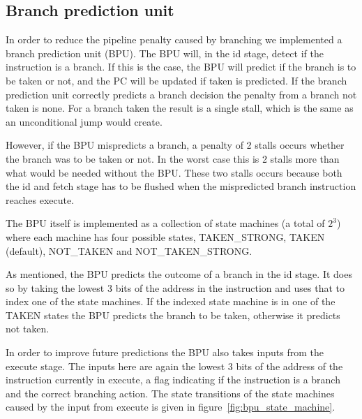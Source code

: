 \subsection{Branch prediction unit}
In order to reduce the pipeline penalty caused by branching we implemented a branch
prediction unit (BPU). The BPU will, in the id stage, detect if the 
instruction is a branch. If this is the case, the BPU will predict if the branch
is to be taken or not, and the PC will be updated if taken is predicted.
If the branch prediction unit correctly predicts a branch decision
the penalty from a branch not taken is none. For a branch taken the
result is a single stall, which is the same as an unconditional jump would create.

However, if the BPU mispredicts a branch, a penalty of 2 stalls occurs whether
the branch was to be taken or not. In the worst case this is 2 stalls more than
what would be needed without the BPU. These two stalls occurs because both the
id and fetch stage has to be flushed when the mispredicted branch instruction reaches execute.

The BPU itself is implemented as a collection of state machines (a total of $2^3$)
where each machine has four possible states, TAKEN\_STRONG, TAKEN (default),
NOT\_TAKEN and NOT\_TAKEN\_STRONG. 

As mentioned, the BPU predicts the outcome of a branch in the id stage. It does
so by taking the lowest 3 bits of the address in the instruction and uses that 
to index one of the state machines. If the indexed state machine is in one 
of the TAKEN states the BPU predicts the branch to be taken, otherwise it
predicts not taken. 

In order to improve future predictions the BPU also takes inputs from the
execute stage. The inputs here are again the lowest 3 bits of the address of the
instruction currently in execute, a flag indicating if the instruction is a
branch and the correct branching action. The state transitions of the 
state machines caused by the input from execute is given in 
figure~\ref{fig:bpu_state_machine}.

